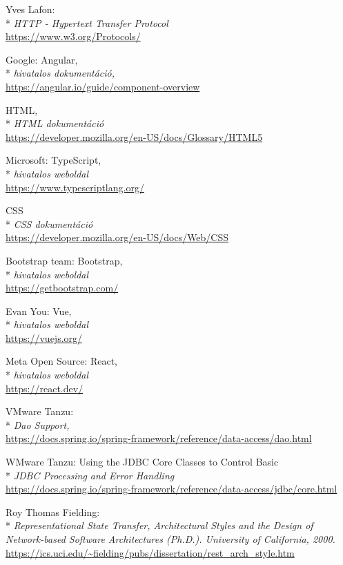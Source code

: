 \begin{thebibliography}{x}
 Yves Lafon:\\*
\textit{HTTP - Hypertext Transfer Protocol}
\\ \url{https://www.w3.org/Protocols/}

 Google: Angular,\\*
\textit{hivatalos dokumentáció,}
\\ \url{https://angular.io/guide/component-overview}

  HTML,\\*
\textit{HTML dokumentáció}
\\ \url{https://developer.mozilla.org/en-US/docs/Glossary/HTML5}

 Microsoft: TypeScript,\\*
\textit{hivatalos weboldal}
\\ \url{https://www.typescriptlang.org/}

 CSS\\*
\textit{CSS dokumentáció}
\\ \url{https://developer.mozilla.org/en-US/docs/Web/CSS}

 Bootstrap team: Bootstrap,\\*
\textit{hivatalos weboldal}
\\ \url{https://getbootstrap.com/}

 Evan You: Vue,\\*
\textit{hivatalos weboldal}
\\ \url{https://vuejs.org/}

 Meta Open Source: React,\\*
\textit{hivatalos weboldal}
\\ \url{https://react.dev/}

 VMware Tanzu:\\*
\textit{Dao Support,}
\\ \url{https://docs.spring.io/spring-framework/reference/data-access/dao.html}

 WMware Tanzu: Using the JDBC Core Classes to Control Basic\\*
\textit{JDBC Processing and Error Handling}
\\ \url{https://docs.spring.io/spring-framework/reference/data-access/jdbc/core.html}

 Roy Thomas Fielding:\\*
\textit{Representational State Transfer,
Architectural Styles and the Design of Network-based Software Architectures (Ph.D.).
University of California,
2000.}
\\ \url{https://ics.uci.edu/~fielding/pubs/dissertation/rest_arch_style.htm}


\end{thebibliography}
